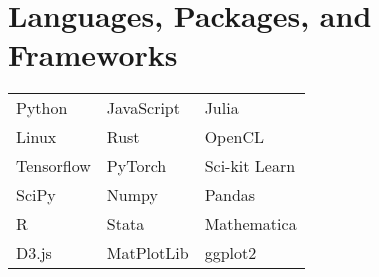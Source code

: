 \documentclass[10pt,a4paper,sans]{moderncv}
\begin{document}
\section{Languages, Packages, and Frameworks}
\def\arraystretch{0}
\raggedleft
\begin{tabularx}{.9\textwidth}{>{\center\arraybackslash}X >{\center\arraybackslash}X >{\center\arraybackslash}X}
Python & JavaScript & Julia \\
Linux & Rust & OpenCL \\
Tensorflow & PyTorch & Sci-kit Learn \\
SciPy & Numpy & Pandas \\
R & Stata & Mathematica \\
	D3.js & MatPlotLib & ggplot2

\end{tabularx}
\end{document}

